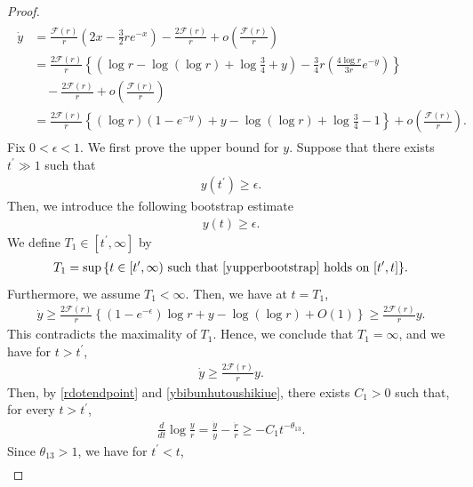 \documentclass[10pt,a4paper]{amsart}
\numberwithin{equation}{section}
\begin{document}
\begin{proof}
\begin{align}\label{ydotendpoint}
\begin{aligned}
\dot{y}&=\frac{\mathcal{F}(r)}{r}\left(2x-\frac{3}{2}re^{-x}\right)-\frac{2\mathcal{F}(r)}{r}+o\left(\frac{\mathcal{F}(r)}{r}\right)
\\
&=\frac{2\mathcal{F}(r)}{r}\left\{\left(\log{r}-\log{(\log{r})}+\log{\frac{3}{4}}+y\right)-\frac{3}{4}r\left(\frac{4\log{r}}{3r}e^{-y}\right) \right\}
\\
&\quad-\frac{2\mathcal{F}(r)}{r}+o\left(\frac{\mathcal{F}(r)}{r}\right)
\\
&=\frac{2\mathcal{F}(r)}{r}\left\{\left(\log{r}\right)\left(1-e^{-y}\right)+y-\log{(\log{r})}+\log{\frac{3}{4}}-1\right\}+o\left(\frac{\mathcal{F}(r)}{r}\right).
\end{aligned}
\end{align}
Fix $0<\epsilon<1$. We first prove the upper bound for $y$. Suppose
that there exists $t^{\prime}\gg1$ such that
\begin{align*}
y(t^{\prime})\geq\epsilon.
\end{align*}
Then, we introduce the following bootstrap estimate
\begin{align}\label{yupperbootstrap}
y(t)\geq \epsilon.
\end{align}
We define $T_1\in [t^{\prime},\infty]$ by
\begin{align}\label{yupperexit}
T_1=\sup{\{t\in[t^{\prime},\infty)\ \mbox{such that}\ \eqref{yupperbootstrap}\ \mbox{holds on}\ [t^{\prime},t] \}}.
\end{align}
Furthermore, we assume $T_1<\infty$. Then, we have at $t=T_1$,
\begin{align*}
\dot{y}\geq\frac{2\mathcal{F}(r)}{r}\left\{\left(1-e^{-\epsilon}\right)\log r+y-\log(\log r)+O(1)\right\}\geq\frac{2\mathcal{F}(r)}{r}y.
\end{align*}
This contradicts the maximality of $T_1$. Hence, we conclude that $T_1=\infty$, and we have for $t>t^{\prime}$,
\begin{align}\label{ybibunhutoushikiue}
\dot{y}\geq\frac{2\mathcal{F}(r)}{r}y.
\end{align}
Then, by \eqref{rdotendpoint} and \eqref{ybibunhutoushikiue}, there exists $C_1>0$ such that, for every $t>t^{\prime}$,
\begin{align*}
\frac{d}{dt}\log\frac{y}{r}=\frac{\dot{y}}{y}-\frac{\dot{r}}{r}\geq-C_1t^{-\theta_{13}}.
\end{align*}
Since $\theta_{13}>1$, we have for $t^{\prime}<t$,
\begin{align*}

\end{align*}
\end{proof}
\end{document}
